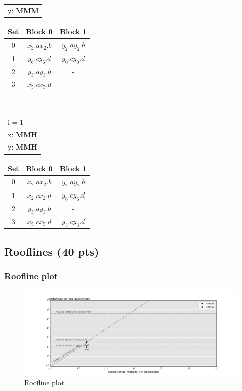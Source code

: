\begin{enumerate}[label=\roman*. ]
\begin{table}[h!]
\begin{tabular}[t]{l}
        y: \textbf{MMM}\\
    \end{tabular}
    \begin{tabular}[t]{|c|c|c|}
    Set & Block 0 & Block 1 \\ \hline
    0 & $x_2.a$\quad$x_2.b$ & $y_2.a$\quad$y_2.b$ \\ \hline
    1 & $y_6.c$\quad$y_6.d$ & $y_0.c$\quad$y_0.d$ \\ \hline
    2 & $y_3.a$\quad$y_3.b$ & - \\ \hline
    3 & $x_5.c$\quad$x_5.d$ & - \\ \hline
    \end{tabular}
\end{table}\\
\begin{table}[h!]
    \begin{tabular}[t]{l}
        i = 1\\
        x: \textbf{MMH}\\
        y: \textbf{MMH}\\
    \end{tabular}
    \begin{tabular}[t]{|c|c|c|}
    Set & Block 0 & Block 1 \\ \hline
    0 & $x_2.a$\quad$x_2.b$ & $y_2.a$\quad$y_2.b$ \\ \hline
    1 & $x_2.c$\quad$x_2.d$ & $y_6.c$\quad$y_6.d$ \\ \hline
    2 & $y_3.a$\quad$y_3.b$ & - \\ \hline
    3 & $x_5.c$\quad$x_5.d$ & $y_3.c$\quad$y_3.d$ \\ \hline
    \end{tabular}
    \end{table}
\end{enumerate}
\subsection{Rooflines (40 pts)}
\subsubsection{Roofline plot}
\begin{figure}[h!]
    \centering
    \includegraphics[width=.8\linewidth]{../out/ex3a.pdf}
    \caption{Roofline plot}
    \label{fig:roofline}
\end{figure}
